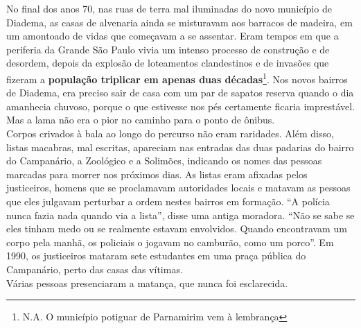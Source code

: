 \documentclass[
	12pt,				%
	openright,			%
	twoside,			%
	a4paper,			%
	chapter=TITLE,		%
	section=TITLE,		%
	subsection=TITLE,	%
	subsubsection=TITLE,%
	spanish,            %
	english,			%
	brazil				%
	]{abntex2}
\begin{document}
\begin{citacao}
No final dos anos 70, nas ruas de terra mal iluminadas do novo município de Diadema, as casas de alvenaria ainda se misturavam aos barracos
de madeira, em um amontoado de vidas que começavam a se assentar. Eram tempos em que a periferia da Grande São Paulo vivia um intenso
processo de construção e de desordem, depois da explosão de loteamentos clandestinos e de invasões que fizeram a \textbf{população triplicar em
apenas duas décadas}\footnote{N.A. O município potiguar de Parnamirim vem à lembrança}. Nos novos bairros de Diadema, era preciso sair de casa com um par de sapatos reserva quando
o dia amanhecia chuvoso, porque o que estivesse nos pés certamente ficaria imprestável. Mas a lama não era o pior no caminho para o ponto de ônibus.\\
Corpos crivados à bala ao longo do percurso não eram raridades. Além disso, listas macabras, mal escritas, apareciam nas entradas das duas padarias do bairro do Campanário, a Zoológico e a Solimões, indicando os nomes das pessoas marcadas para morrer
nos próximos dias. As listas eram afixadas pelos justiceiros, homens que se proclamavam autoridades locais e matavam as pessoas que eles
julgavam perturbar a ordem nestes bairros em formação. “A polícia nunca fazia nada quando via a lista”, disse uma antiga moradora. “Não se sabe se eles tinham medo ou se realmente estavam envolvidos. Quando encontravam um corpo pela manhã, os policiais o
jogavam no camburão, como um porco”. Em 1990, os justiceiros mataram sete estudantes em uma praça pública do Campanário, perto das casas das vítimas.\\
Várias pessoas presenciaram a matança, que nunca foi esclarecida.\cite[p. ~3, grifo do autor]{Braudel}
\end{citacao}
\end{document}
